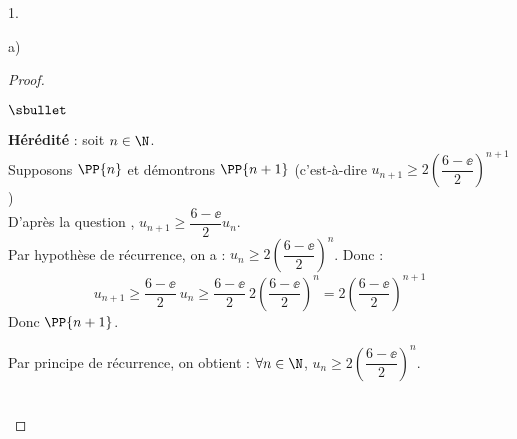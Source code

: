 \documentclass[11pt]{article}%
\begin{document}
\begin{noliste}{1.}
\begin{noliste}{a)}
\begin{proof}
\begin{remark}
\begin{noliste}{$\sbullet$}
\begin{noliste}{\fitem}
      \item {\bf Hérédité} : soit $n\in\N$.\\
        Supposons $\PP{n}$ et démontrons $\PP{n+1}$ (c'est-à-dire
        $u_{n+1}\geq 2 \left(\dfrac{6-\ee}{2}\right)^{n+1}$)\\
        D'après la question , $u_{n+1}\geq
        \dfrac{6-\ee}{2} u_n$.\\
        Par hypothèse de récurrence, on a : $u_n\geq 2
        \left(\dfrac{6-\ee}{2}\right)^n$. Donc :
        \[
        u_{n+1} \geq \dfrac{6-\ee}{2} \ u_n \geq 
        \dfrac{6-\ee}{2} \ 2 \left(\dfrac{6-\ee}{2}\right)^n = 
        2 \left(\dfrac{6-\ee}{2}\right)^{n+1}
        \]
        Donc $\PP{n+1}$.
      \end{noliste}
      Par principe de récurrence, on obtient : $\forall n\in\N$, 
      $u_n\geq 2 \left(\dfrac{6-\ee}{2}\right)^n$.
      
    \end{noliste}
  \end{remark}~\\[-1.4cm]
\end{proof}
\end{noliste}
\end{noliste}
\end{document}
